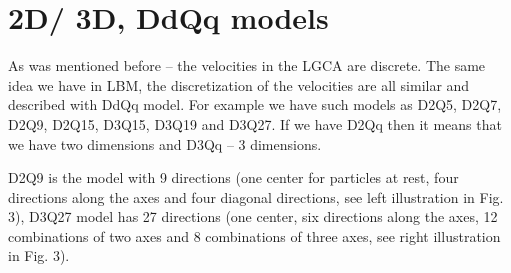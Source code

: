 
\section{2D/ 3D, DdQq models}

As was mentioned before – the velocities in the LGCA are discrete. The same idea we have in LBM, the discretization of the velocities are all similar and described with DdQq model. For example we have such models as D2Q5, D2Q7, D2Q9, D2Q15, D3Q15, D3Q19 and D3Q27. If we have D2Qq then it means that we have two dimensions and D3Qq – 3 dimensions.

D2Q9 is the model with 9 directions (one center for particles at rest, four directions along the axes and four diagonal directions, see left illustration in Fig. 3), D3Q27 model has 27 directions (one center, six directions along the axes, 12 combinations of two axes and 8 combinations of three axes, see right illustration in Fig. 3).

